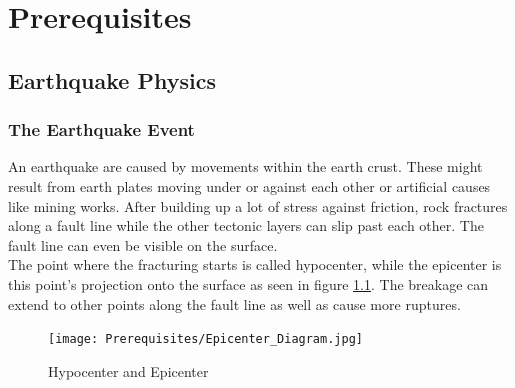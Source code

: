 \documentclass[thesis.tex]{subfiles}
\begin{document}
\chapter{Prerequisites}\label{chap:preq}
\section{Earthquake Physics}\label{section:geophysikalische_grundlagen}
\subsection{The Earthquake Event}
An earthquake are caused by movements within the earth crust. These might result from earth plates moving under or against each other or artificial causes like mining works. After building up a lot of stress against friction, rock fractures along a fault line while the other tectonic layers can slip past each other. The fault line can even be visible on the surface. \\
The point where the fracturing starts is called hypocenter, while the epicenter is this point's projection onto the surface as seen in figure \ref{fig:hypocenter}. The breakage can extend to other points along the fault line as well as cause more ruptures. 
\begin{figure}[h!]
	\centering
	\texttt{[image: Prerequisites/Epicenter\_Diagram.jpg]}
	\caption{Hypocenter and Epicenter}
	\label{fig:hypocenter}
\end{figure}
\end{document}
